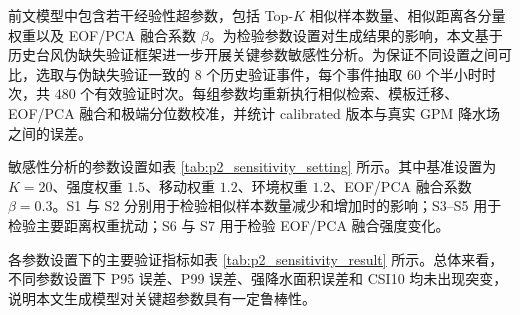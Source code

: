 \documentclass[UTF8,a4paper,zihao=5]{ctexart}
\numberwithin{equation}{section}
\numberwithin{figure}{section}
\numberwithin{table}{section}
\begin{document}
前文模型中包含若干经验性超参数，包括 Top-$K$ 相似样本数量、相似距离各分量权重以及 EOF/PCA 融合系数 $\beta$。为检验参数设置对生成结果的影响，本文基于历史台风伪缺失验证框架进一步开展关键参数敏感性分析。为保证不同设置之间可比，选取与伪缺失验证一致的 $8$ 个历史验证事件，每个事件抽取 $60$ 个半小时时次，共 $480$ 个有效验证时次。每组参数均重新执行相似检索、模板迁移、EOF/PCA 融合和极端分位数校准，并统计 calibrated 版本与真实 GPM 降水场之间的误差。

敏感性分析的参数设置如表 \ref{tab:p2_sensitivity_setting} 所示。其中基准设置为 $K=20$、强度权重 $1.5$、移动权重 $1.2$、环境权重 $1.2$、EOF/PCA 融合系数 $\beta=0.3$。S1 与 S2 分别用于检验相似样本数量减少和增加时的影响；S3--S5 用于检验主要距离权重扰动；S6 与 S7 用于检验 EOF/PCA 融合强度变化。

\begin{table}[H]
\centering
\caption{相似检索与结构融合参数敏感性设置}
\label{tab:p2_sensitivity_setting}
\end{table}

各参数设置下的主要验证指标如表 \ref{tab:p2_sensitivity_result} 所示。总体来看，不同参数设置下 P95 误差、P99 误差、强降水面积误差和 CSI10 均未出现突变，说明本文生成模型对关键超参数具有一定鲁棒性。
\end{document}
